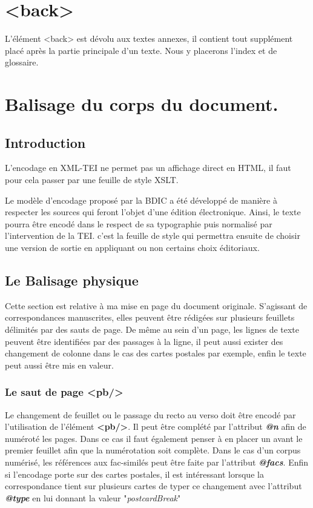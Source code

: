 \documentclass[18pt,a4paper,oneside]{book} %
\begin{document}
\section{<back>}

L'élément <back> est dévolu aux textes annexes, il contient tout supplément placé après la partie principale d'un texte. 
Nous y placerons l'index et de glossaire.

\section{Balisage du corps du document.}

\subsection{Introduction}

L'encodage en XML-TEI ne permet pas un affichage direct en HTML, il faut pour cela passer par une feuille de style XSLT.

Le modèle d'encodage proposé par la BDIC a été développé de manière à respecter les sources qui feront l'objet d'une édition électronique. Ainsi, le texte pourra être encodé dans le respect de sa typographie puis normalisé par l'intervention de la TEI. c'est la feuille de style qui permettra ensuite de choisir une version de sortie en appliquant ou non certains choix éditoriaux.


\subsection{Le Balisage physique}

Cette section est relative à ma mise en page du document originale. S'agissant de correspondances manuscrites, elles peuvent être rédigées sur plusieurs feuillets délimités par des sauts de page. De même au sein d'un page, les lignes de texte peuvent être identifiées par des passages à la ligne, il peut aussi exister des changement de colonne dans le cas des cartes postales par exemple, enfin le texte peut aussi être mis en valeur.

\subsubsection{Le saut de page <pb/>}

Le changement de feuillet ou le passage du recto au verso doit être encodé par l'utilisation de l'élément \textbf{<pb/>}. Il peut être complété par l'attribut \textit{\textbf{@n}} afin de numéroté les pages. Dans ce cas il faut également penser à en placer un avant le premier feuillet afin que la numérotation soit complète.
Dans le cas d'un corpus numérisé, les références aux fac-similés peut être faite par l'attribut \textit{\textbf{@facs}}. Enfin si l'encodage porte sur des cartes postales, il est intéressant lorsque la correspondance tient sur plusieurs cartes de typer ce changement avec l'attribut \textit{\textbf{@type}} en lui donnant la valeur "\textit{postcardBreak}"
\bigskip 
\end{document}
